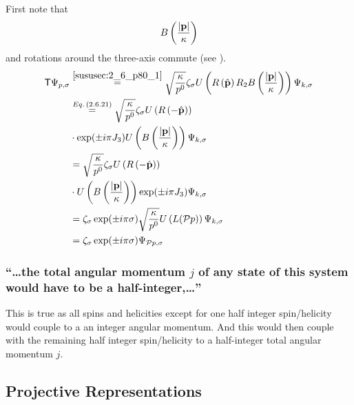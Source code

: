 \subsubsection{ }
First note that \[B\left(\dfrac{\abs{\mathbf{p}}}{\kappa}\right)\] and rotations around the three-axis commute (see ).
\begin{align*} 
	\mathsf{T}\Psi_{p,\sigma}&\overset{\ref{sususec:2_6_p80_1}}{=}\sqrt{\dfrac{\kappa}{p^0}}\zeta_\sigma U\left( R\left(\hat{\mathbf{p}}\right)R_2  B\left(\dfrac{\abs{\mathbf{p}}}{\kappa}\right)\right)\Psi_{k,\sigma}\\
	&\overset{Eq.\,({2.6.21})}{=}\sqrt{\dfrac{\kappa}{p^0}}\zeta_\sigma U\left( R\left(-\hat{\mathbf{p}}\right)\right)\\
	&\cdot\exp(\pm i \pi J_3)U\left(  B\left(\dfrac{\abs{\mathbf{p}}}{\kappa}\right)\right)\Psi_{k,\sigma}\\
	&=\sqrt{\dfrac{\kappa}{p^0}}\zeta_\sigma U\left( R\left(-\hat{\mathbf{p}}\right)\right)\\
	&\cdot U\left(  B\left(\dfrac{\abs{\mathbf{p}}}{\kappa}\right)\right)\exp(\pm i \pi J_3)\Psi_{k,\sigma}\\
	&=\zeta_\sigma \exp(\pm i \pi \sigma) \sqrt{\dfrac{\kappa}{p^0}}U\left(L(\mathcal{\mathcal{P}} p)\right)\Psi_{k,\sigma}\\
	&=\zeta_\sigma \exp(\pm i \pi \sigma) \Psi_{\mathcal{\mathcal{P}} p,\sigma}
\end{align*}

\subsubsection{\enquote{\dots the total angular momentum $j$ of any state of this system would have to be a half-integer,\dots} }
This is true as all spins and helicities except for one half integer spin/helicity would couple to a an integer angular momentum. And this would then couple with the remaining half integer spin/helicity to a half-integer total angular momentum $j$.


\subsection{Projective Representations}\label{susec:2_7}

